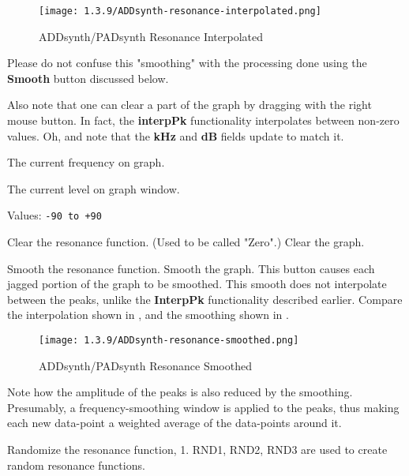 \begin{figure}[H]
   \centering
   \texttt{[image: 1.3.9/ADDsynth-resonance-interpolated.png]}
   \caption{ADDsynth/PADsynth Resonance Interpolated}
   \label{fig:addsynth_resonance_interpolated}
\end{figure}


   Please do not confuse this "smoothing" with the processing done using the
   \textbf{Smooth} button discussed below.

   Also note that one can clear a part of the graph
   by dragging with the right mouse button. In fact, the \textbf{interpPk}
   functionality interpolates between non-zero values.
   Oh, and note that the \textbf{kHz} and \textbf{dB} fields update to match it.

   The current frequency on graph.

   The current level on graph window.

   Values: \texttt{-90 to +90}

   Clear the resonance function.  (Used to be called "Zero".)
   Clear the graph.

   Smooth the resonance function.
   Smooth the graph.
   This button causes each jagged portion of the graph to be smoothed.
   This smooth does not interpolate between the peaks, unlike the
   \textbf{InterpPk} functionality described earlier.  Compare the
   interpolation shown in ,
   and the smoothing shown in .

\begin{figure}[H]
   \centering
   \texttt{[image: 1.3.9/ADDsynth-resonance-smoothed.png]}
   \caption{ADDsynth/PADsynth Resonance Smoothed}
   \label{fig:addsynth_resonance_smoothed}
\end{figure}

   Note how the amplitude of the peaks is also reduced by the smoothing.
   Presumably, a frequency-smoothing window is applied to the peaks, thus making
   each new data-point a weighted average of the data-points around it.

   Randomize the resonance function, 1.
   RND1, RND2, RND3 are used to create random resonance functions.

